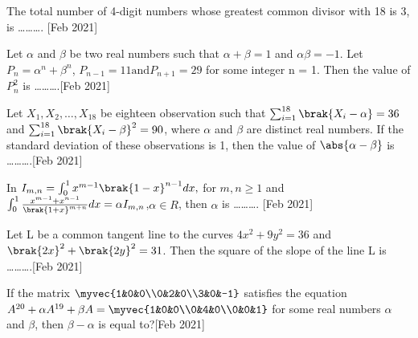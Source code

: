 \iffalse
\title{Feb:2021}
\author{AI24BTECH11008}
\section{integer}
\fi
\item The total number of 4-digit numbers whose greatest common divisor with 18 is 3, is \ldots\ldots\ldots.\vspace{0.5mm} \hfill [Feb 2021]\\

\item Let $\alpha$ and $\beta$ be two real numbers such that $\alpha + \beta = 1$ and $\alpha\beta = -1$. Let $P_n = \alpha^n + \beta^n$, $P_{n-1} = 11 \text{and} P_{n+1} = 29$ for some integer n = 1. Then the value of $P_n ^2$ is \ldots\ldots\ldots.\vspace{0.5mm}\hfill [Feb 2021]\\
\item Let $X_1,X_2,\ldots,X_{18}$ be eighteen observation such that $\sum_{i=1} ^{18} \brak{X_i - \alpha} = 36$ and $\sum_{i=1} ^{18} \brak{X_i - \beta}^2 = 90$, where $\alpha$ and $\beta$ are distinct real numbers. If the standard deviation of these observations is 1, then the value of $\abs{\alpha - \beta}$ is \ldots\ldots\ldots.\vspace{0.5mm}\hfill [Feb 2021] \\ 
\item In $I_{m,n} = \int _0 ^1 x^{m-1}\brak{1-x}^{n-1}dx,$ for $m,n\geq1$ and $\int _0 ^1\frac{x^{m-1} + x^{n-1}}{\brak{1+x}^{m+n}}dx = \alpha I_{m,n}$,$\alpha \in R$, then $\alpha$ is \ldots\ldots\ldots. \vspace{0.5mm}\hfill [Feb 2021]\\
\item Let L be a common tangent line to the curves $4x^2 + 9y^2 = 36$ and $\brak{2x}^2 + \brak{2y}^2=31$. Then the square of the slope of the line L is \ldots\ldots\ldots.\vspace{0.5mm}\hfill [Feb 2021]\\
\item If the matrix $\myvec{1&0&0\\0&2&0\\3&0&-1}$
satisfies the equation $A^{20} + \alpha A^{19} + \beta A = \myvec{1&0&0\\0&4&0\\0&0&1}$ for some real numbers $\alpha$ and $\beta$, then $\beta - \alpha$ is equal to?\vspace{0.5mm}\hfill [Feb 2021]\\
